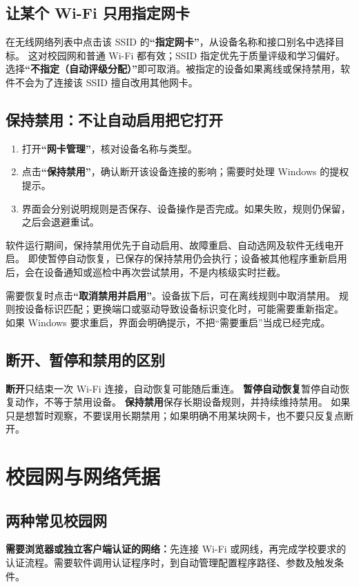 \documentclass[UTF8,fontset=fandol,11pt,a4paper]{ctexart}
\newcommand{\ui}[1]{\textbf{“#1”}}
\begin{document}
\subsection{让某个 Wi-Fi 只用指定网卡}
在无线网络列表中点击该 SSID 的\ui{指定网卡}，从设备名称和接口别名中选择目标。
这对校园网和普通 Wi-Fi 都有效；SSID 指定优先于质量评级和学习偏好。
选择\ui{不指定（自动评级分配）}即可取消。被指定的设备如果离线或保持禁用，软件不会为了连接该 SSID 擅自改用其他网卡。

\subsection{保持禁用：不让自动启用把它打开}
\begin{enumerate}
\item 打开\ui{网卡管理}，核对设备名称与类型。
\item 点击\ui{保持禁用}，确认断开该设备连接的影响；需要时处理 Windows 的提权提示。
\item 界面会分别说明规则是否保存、设备操作是否完成。如果失败，规则仍保留，之后会退避重试。
\end{enumerate}
软件运行期间，保持禁用优先于自动启用、故障重启、自动选网及软件无线电开启。
即使暂停自动恢复，已保存的保持禁用仍会执行；设备被其他程序重新启用后，会在设备通知或巡检中再次尝试禁用，不是内核级实时拦截。

需要恢复时点击\ui{取消禁用并启用}。设备拔下后，可在离线规则中取消禁用。
规则按设备标识匹配；更换端口或驱动导致设备标识变化时，可能需要重新指定。
如果 Windows 要求重启，界面会明确提示，不把“需要重启”当成已经完成。

\subsection{断开、暂停和禁用的区别}
\textbf{断开}只结束一次 Wi-Fi 连接，自动恢复可能随后重连。
\textbf{暂停自动恢复}暂停自动恢复动作，不等于禁用设备。
\textbf{保持禁用}保存长期设备规则，并持续维持禁用。
如果只是想暂时观察，不要误用长期禁用；如果明确不用某块网卡，也不要只反复点断开。

\section{校园网与网络凭据}
\subsection{两种常见校园网}
\textbf{需要浏览器或独立客户端认证的网络：}先连接 Wi-Fi 或网线，再完成学校要求的认证流程。需要软件调用认证程序时，到自动管理配置程序路径、参数及触发条件。
\end{document}
